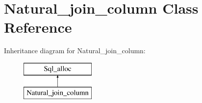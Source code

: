 \hypertarget{classNatural__join__column}{}\section{Natural\+\_\+join\+\_\+column Class Reference}
\label{classNatural__join__column}
Inheritance diagram for Natural\+\_\+join\+\_\+column\+:\begin{figure}[H]
\begin{center}
\leavevmode
\includegraphics[height=2.000000cm]{classNatural__join__column}
\end{center}
\end{figure}
